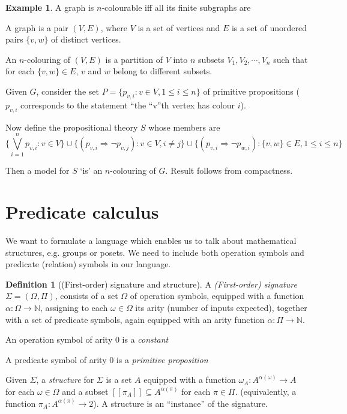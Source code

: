 \documentclass[a4paper]{article}
\theoremstyle{definition}
\newtheorem*{defi}{Definition}
\newtheorem*{eg}{Example}
\newcommand{\N}{\mathbb{N}}
\let\stdsection\section
\renewcommand\section{\newpage\stdsection}
\begin{document}
\begin{eg}
  A graph is $n$-colourable iff all its finite subgraphs are

  A graph is a pair $(V, E)$, where $V$ is a set of vertices and $E$ is a set of unordered pairs $\{v, w\}$ of distinct vertices.

  An $n$-colouring of $(V, E)$ is a partition of $V$ into $n$ subsets $V_1, V_2, \cdots, V_n$ such that for each $\{v, w\}\in E$, $v$ and $w$ belong to different subsets. 

  Given $G$, consider the set $P = \{p_{v, i}: v\in V, 1\leq i\leq n\}$ of primitive propositions ($p_{v, i}$ corresponds to the statement ``the ``v''th vertex has colour $i$).

Now define the propositional theory $S$ whose members are
$$\{\bigvee_{i = 1}^n p_{v,i}: v\in V\} \cup \{(p_{v,i}\Rightarrow \neg p_{v, j}): v\in V, i\not= j\} \cup \{(p_{v,i}\Rightarrow \neg p_{w, i}): \{v, w\}\in E, 1\leq i\leq n\}$$

Then a model for $S$ `is' an $n$-colouring of $G$. Result follows from compactness.
\end{eg}
\section{Predicate calculus}
We want to formulate a language which enables us to talk about mathematical structures, e.g. groups or posets. We need to include both operation symbols and predicate (relation) symbols in our language.

\begin{defi}[(First-order) signature and structure]
  A \emph{(First-order) signature} $\Sigma = (\Omega, \Pi)$, consists of a set $\Omega$ of operation symbols, equipped with a function $\alpha: \Omega \to \N$, assigning to each $\omega \in \Omega$ its arity (number of inputs expected), together with a set of predicate symbols, again equipped with an arity function $\alpha: \Pi\to \N$.

  An operation symbol of arity 0 is a \emph{constant}

  A predicate symbol of arity 0 is a \emph{primitive proposition}

  Given $\Sigma$, a \emph{structure} for $\Sigma$ is a set $A$ equipped with a function $\omega_A: A^{\alpha(\omega)}\to A$ for each $\omega \in \Omega$ and a subset $[\![\pi_A]\!] \subseteq A^{\alpha(\pi)}$ for each $\pi \in \Pi$. (equivalently, a function $\pi_A: A^{\alpha(\pi)} \to 2$). A structure is an ``instance'' of the signature.
\end{defi}
\end{document}
